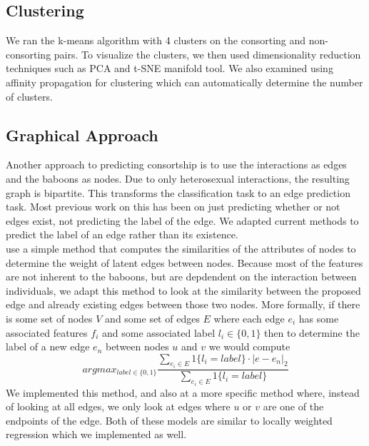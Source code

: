 \documentclass[twoside,twocolumn,paper=letter,fontsize=11pt]{article}
\begin{document}
\subsection{Clustering}

We ran the k-means algorithm with 4 clusters on the consorting and
non-consorting pairs. To visualize the clusters, we then used dimensionality
reduction techniques such as PCA and t-SNE manifold tool. We also examined
using affinity propagation for clustering which can automatically determine the
number of clusters.

\subsection{Graphical Approach}

Another approach to predicting consortship is to use the interactions as edges
and the baboons as nodes. Due to only heterosexual interactions, the resulting
graph is bipartite. This transforms the classification task to an edge
prediction task. Most previous work on this has been on just predicting whether
or not edges exist, not predicting the label of the edge. We adapted current
methods to predict the label of an edge rather than its existence.\\ 

\cite{Macskassy:2007} use a simple method that computes the similarities of the
attributes of nodes to determine the weight of latent edges between nodes.
Because most of the features are not inherent to the baboons, but are
depdendent on the interaction between individuals, we adapt this method to look
at the similarity between the proposed edge and already existing edges between
those two nodes. More formally, if there is some set of nodes $V$ and some set
of edges $E$ where each edge $e_i$ has some associated features $f_i$ and some
associated label $l_i\in \{0,1\}$ then to determine the label of a new edge
$e_n$ between nodes $u$ and $v$ we would compute $$argmax_{label \in \{0,1\}}
\frac{\sum_{e_i \in E}1\{l_i=label\}\cdot|e-e_n|_2}{\sum_{e_i \in
E}1\{l_i=label\}}$$ We implemented this method, and also at a more specific
method where, instead of looking at all edges, we only look at edges where $u$
or $v$ are one of the endpoints of the edge. Both of these models are similar
to locally weighted regression which we implemented as well. \\
\end{document}
